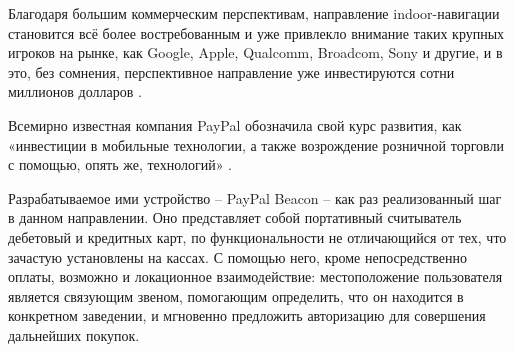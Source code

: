 Благодаря большим коммерческим перспективам, направление indoor-на\-ви\-га\-ции становится всё более востребованным и уже привлекло внимание таких крупных игроков на рынке, как Google, Apple, Qualcomm, Broadcom, Sony и другие, и в это, без сомнения, перспективное направление уже инвестируются сотни миллионов долларов \cite{web:meetBeacons}.

Всемирно известная компания PayPal обозначила свой курс развития, как «инвестиции в мобильные технологии, а также возрождение розничной торговли с помощью, опять же, технологий» \cite{web:PayPal}.

Разрабатываемое ими устройство – PayPal Beacon – как раз реализованный шаг в данном направлении. Оно представляет собой портативный считыватель дебетовый и кредитных карт, по функциональности не отличающийся от тех, что зачастую установлены на кассах. С помощью него, кроме непосредственно оплаты, возможно и локационное взаимодействие: местоположение пользователя является связующим звеном, помогающим определить, что он находится в конкретном заведении, и мгновенно предложить авторизацию для совершения дальнейших покупок.